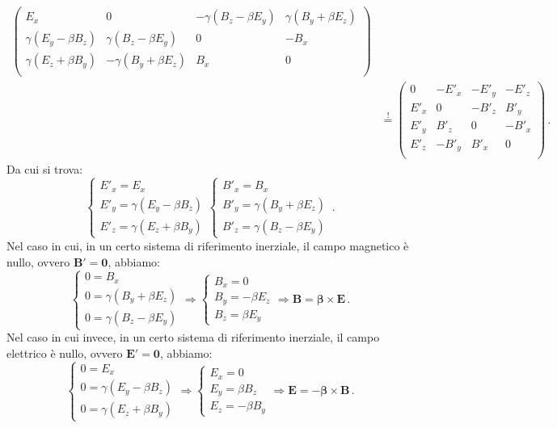 \documentclass[twoside]{article}
\begin{document}
\begin{align*}
\begin{pmatrix}
        E_x						& 0 					& -\gamma (B_z-\beta E_y)	& \gamma (B_y+\beta E_z)  \\
        \gamma (E_y-\beta B_z)	&\gamma (B_z-\beta E_y)	& 0							& -B_x                    \\
        \gamma (E_z+\beta B_y)	&-\gamma (B_y+\beta E_z)& B_x						& 0                       \\
    \end{pmatrix} \\
    &\overset{!}{=}
    \begin{pmatrix}
        0		& -E'_x & -E'_y & -E'_z \\
        E'_x 	& 0		& -B'_z & B'_y  \\
        E'_y	& B'_z	& 0 	& -B'_x \\
        E'_z	& -B'_y	& B'_x 	& 0    \\
    \end{pmatrix} \, .
\end{align*}
Da cui si trova:
\begin{equation}
\begin{cases}
E'_x=E_x \\
E'_y=\gamma(E_y-\beta B_z) \\
E'_z=\gamma(E_z+\beta B_y)
\end{cases}
\begin{cases}
B'_x=B_x \\
B'_y=\gamma(B_y+\beta E_z) \\
B'_z=\gamma(B_z-\beta E_y) 
\end{cases} \, .
\end{equation}
Nel caso in cui, in un certo sistema di riferimento inerziale, il campo magnetico è nullo, ovvero $\mathbf{B'}=\mathbf{0}$, abbiamo:
\begin{equation*}
\begin{cases}
0=B_x \\
0=\gamma(B_y+\beta E_z) \\
0=\gamma(B_z-\beta E_y) 
\end{cases} 
\Rightarrow
\begin{cases}
B_x=0 \\
B_y=-\beta E_z \\
B_z=\beta E_y
\end{cases} 
\Rightarrow \mathbf{B}=\bm{\beta}\times\mathbf{E} \, .
\end{equation*}
Nel caso in cui invece, in un certo sistema di riferimento inerziale, il campo elettrico è nullo, ovvero $\mathbf{E'}=\mathbf{0}$, abbiamo:
\begin{equation*}
\begin{cases}
0=E_x \\
0=\gamma(E_y-\beta B_z) \\
0=\gamma(E_z+\beta B_y)
\end{cases}
\Rightarrow
\begin{cases}
E_x=0 \\
E_y=\beta B_z \\
E_z=-\beta B_y
\end{cases}
\Rightarrow \mathbf{E}=-\bm{\beta}\times\mathbf{B} \, .
\end{equation*}
\\ \\
\end{document}
